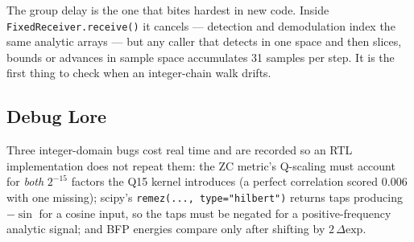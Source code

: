 The group delay is the one that bites hardest in new code.  Inside
\texttt{FixedReceiver.receive()} it cancels --- detection and
demodulation index the same analytic arrays --- but any caller that
detects in one space and then slices, bounds or advances in sample
space accumulates 31 samples per step.  It is the first thing to check
when an integer-chain walk drifts.

\subsection{Debug Lore}

Three integer-domain bugs cost real time and are recorded so an RTL
implementation does not repeat them: the ZC metric's Q-scaling must
account for \emph{both} $2^{-15}$ factors the Q15 kernel introduces (a
perfect correlation scored 0.006 with one missing); scipy's
\texttt{remez(..., type="hilbert")} returns taps producing $-\sin$ for
a cosine input, so the taps must be negated for a positive-frequency
analytic signal; and BFP energies compare only after shifting by
$2\,\Delta\mathrm{exp}$.
